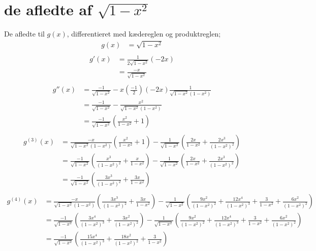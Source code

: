 \chapter{de afledte af $\sqrt{1-x^2}$}
\label{app:afledte}
De afledte til $g(x)$, differentieret med kædereglen og produktreglen;
\begin{align*}
g(x) &= \sqrt{1-x^2} \\
\end{align*}
\begin{align*}
g'(x) &= \frac{1}{2\sqrt{1-x^2}} (-2x)\\
&= \frac{-x}{\sqrt{1-x^2}} \\
\end{align*}
\begin{align*}
g''(x) &= \frac{-1}{\sqrt{1-x^2}} -x\left(\frac{-1}{2}\right)(-2x)\frac{1}{\sqrt{1-x^2}(1-x^2)}\\
&= \frac{-1}{\sqrt{1-x^2}} -\frac{x^2}{\sqrt{1-x^2}(1-x^2)}\\
&= \frac{-1}{\sqrt{1-x^2}}\left(\frac{x^2}{1-x^2}+1\right)\\
\end{align*}
\begin{align*}
g^{(3)}(x) &= \frac{-x}{\sqrt{1-x^2}(1-x^2)}\left(\frac{x^2}{1-x^2}+1\right)- \frac{1}{\sqrt{1-x^2}}\left(\frac{2x}{1-x^2}+\frac{2x^3}{(1-x^2)^2}\right)\\
&= \frac{-1}{\sqrt{1-x^2}}\left(\frac{x^3}{(1-x^2)^2}+\frac{x}{1-x^2}\right)- \frac{1}{\sqrt{1-x^2}}\left(\frac{2x}{1-x^2}+\frac{2x^3}{(1-x^2)^2}\right)\\
&=\frac{-1}{\sqrt{1-x^2}}\left(\frac{3x^3}{(1-x^2)^2}+\frac{3x}{1-x^2}\right) \\
\end{align*}
\begin{align*}
g^{(4)}(x) &= \frac{-x}{\sqrt{1-x^2}(1-x^2)}\left(\frac{3x^3}{(1-x^2)^2}+\frac{3x}{1-x^2}\right)-\frac{1}{\sqrt{1-x^2}}\left(\frac{9x^2}{(1-x^2)^2}+\frac{12x^4}{(1-x^2)^3}+\frac{3}{1-x^2}+\frac{6x^2}{(1-x^2)^2}\right) \\
&= \frac{-1}{\sqrt{1-x^2}}\left(\frac{3x^4}{(1-x^2)^3}+\frac{3x^2}{(1-x^2)^2}\right)-\frac{1}{\sqrt{1-x^2}}\left(\frac{9x^2}{(1-x^2)^2}+\frac{12x^4}{(1-x^2)^3}+\frac{3}{1-x^2}+\frac{6x^2}{(1-x^2)^2}\right) \\
&= \frac{-1}{\sqrt{1-x^2}} \left(\frac{15x^4}{(1-x^2)^3}+\frac{18x^2}{(1-x^2)^2}+\frac{3}{1-x^2}\right)\\
\end{align*}